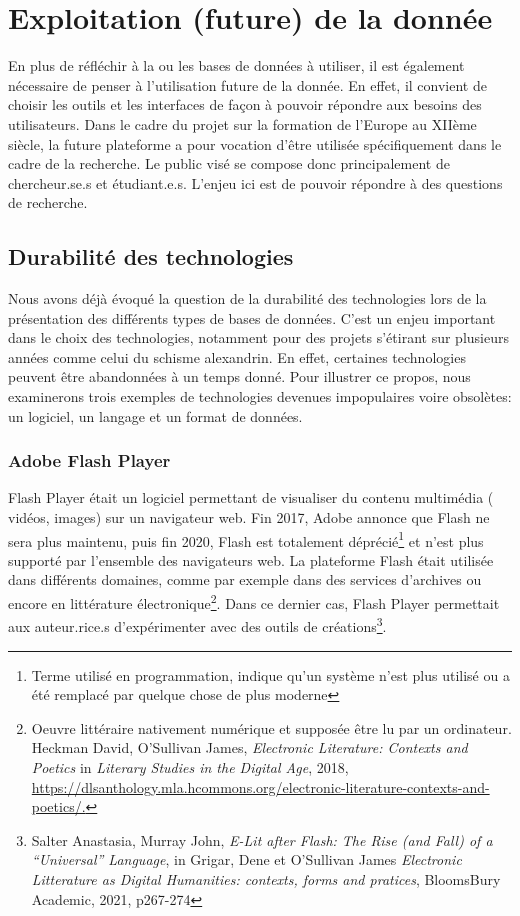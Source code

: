     \chapter{Exploitation (future) de la donnée}

En plus de réfléchir à la ou les bases de données à utiliser, il est également nécessaire de penser à l’utilisation future de la donnée. En effet, il convient de choisir les outils et les interfaces de façon à pouvoir répondre aux besoins des utilisateurs. Dans le cadre du projet sur la formation de l’Europe au XIIème siècle, la future plateforme a pour vocation d’être utilisée spécifiquement dans le cadre de la recherche. Le public visé se compose donc principalement de chercheur.se.s et étudiant.e.s. L’enjeu ici est de pouvoir répondre à des questions de recherche.



    \section{Durabilité des technologies}

Nous avons déjà évoqué la question de la durabilité des technologies lors de la présentation des différents types de bases de données. C’est un enjeu important dans le choix des technologies, notamment pour des projets s’étirant sur plusieurs années comme celui du schisme alexandrin.
En effet, certaines technologies peuvent être abandonnées à un temps donné. Pour illustrer ce propos, nous examinerons trois exemples de technologies devenues impopulaires voire obsolètes: un logiciel, un langage et un format de données.

    \subsection{Adobe Flash Player}
    
Flash Player était un logiciel permettant de visualiser du contenu multimédia ( vidéos, images) sur un navigateur web. Fin 2017, Adobe annonce que Flash ne sera plus maintenu, puis fin 2020, Flash est totalement déprécié\footnote{Terme utilisé en programmation, indique qu'un système n'est plus utilisé ou a été remplacé par quelque chose de plus moderne} et n’est plus supporté par l’ensemble des navigateurs web.
La plateforme Flash était utilisée dans différents domaines, comme par exemple dans des services d’archives ou encore en littérature électronique\footnote{Oeuvre littéraire nativement numérique et supposée être lu par un ordinateur. Heckman David, O’Sullivan James, \textit{Electronic Literature: Contexts and Poetics} in \textit{Literary Studies in the Digital Age}, 2018, \url{https://dlsanthology.mla.hcommons.org/electronic-literature-contexts-and-poetics/.}}. Dans ce dernier cas, Flash Player permettait aux auteur.rice.s d’expérimenter avec des outils de créations\footnote{Salter Anastasia, Murray John, \textit{E-Lit after Flash: The Rise (and Fall) of a “Universal” Language}, in Grigar, Dene et O’Sullivan James \textit{Electronic Litterature as Digital Humanities: contexts, forms and pratices}, BloomsBury Academic, 2021, p267-274}. 


